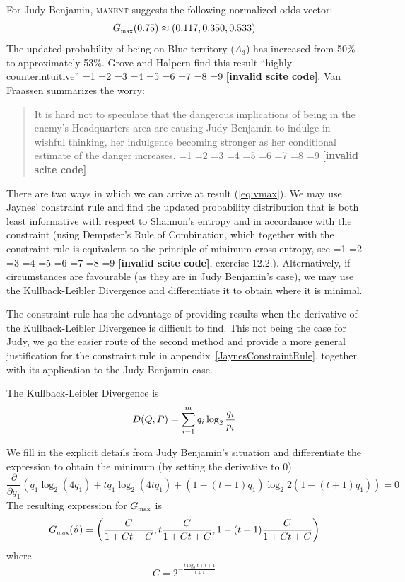 \documentclass[smallextended]{svjour3}       %
\newcommand{\nial}{\noindent} %
\newcommand{\qeins}[1]{``#1''}
\newcommand{\qvu}[0]{\vartheta}
\newcommand{\PageP}{p.~}
\newcommand{\PageP}{}
\newcommand{\scite}[3]{\ifnum#1=1\cite{#2}\else
\ifnum#1=2\cite[{\PageP}~#3]{#2}\else
\ifnum#1=3\cite[{\PageP}~#3]{#2}\else
\ifnum#1=4\cite{#2}\else
\ifnum#1=5\cite{#2}\else
\ifnum#1=6\cite[{\PageP}~#3]{#2}\else
\ifnum#1=7\cite{#2}\else
\ifnum#1=8\cite[{\PageP}~#3]{#2}\else
\ifnum#1=9\cite[{\PageP}~#3]{#2}\else
\textbf{[invalid scite code]}\fi\fi\fi\fi\fi\fi\fi\fi\fi}
\newenvironment{quotex}{\begin{quote}\begin{footnotesize}}{\end{footnotesize}\end{quote}}
\begin{document}
For Judy Benjamin, \textsc{maxent} suggests the following normalized
odds vector:
\begin{equation}
  \label{eq:vmax}
  G_{\mbox{{\tiny max}}}(0.75)\approx(0.117,0.350,0.533)
\end{equation}
The updated probability of being on Blue territory ($A_{3}$) has
increased from 50\% to approximately 53\%. Grove and Halpern find this
result \qeins{highly counterintuitive} \scite{2}{grovehalpern97}{2}.
Van Fraassen summarizes the worry:
\begin{quotex}
  It is hard not to speculate that the dangerous implications of being
  in the enemy's Headquarters area are causing Judy Benjamin to
  indulge in wishful thinking, her indulgence becoming stronger as her
  conditional estimate of the danger increases. \scite{3}{fraassen81}{379}
\end{quotex}

\bigskip

\nial There are two ways in which we can arrive at result
({\ref{eq:vmax}}). We may use Jaynes' constraint rule and find the
updated probability distribution that is both least informative with
respect to Shannon's entropy and in accordance with the constraint
(using Dempster's Rule of Combination, which together with the
constraint rule is equivalent to the principle of minimum
cross-entropy, see \scite{8}{coverthomas06}{409}, exercise 12.2.).
Alternatively, if circumstances are favourable (as they are in Judy
Benjamin's case), we may use the Kullback-Leibler Divergence and
differentiate it to obtain where it is minimal.


The constraint rule has the advantage of providing results when the
derivative of the Kullback-Leibler Divergence is difficult to find.
This not being the case for Judy, we go the easier route of the second
method and provide a more general justification for the constraint
rule in appendix~\ref{JaynesConstraintRule}, together with its
application to the Judy Benjamin case.

The Kullback-Leibler Divergence is
\begin{equation}
  D(Q,P)=\sum_{i=1}^{m}q_{i}\log_{2}\frac{q_{i}}{p_{i}}\notag
\end{equation}

We fill in the explicit details from Judy Benjamin's situation and
differentiate the expression to obtain the minimum (by setting the
derivative to $0$). 
\begin{displaymath}
\frac{\partial}{\partial{}q_{1}}(q_{1}\log_{2}(4q_{1})+tq_{1}\log_{2}(4tq_{1})+(1-(t+1)q_{1})\log_{2}2(1-(t+1)q_{1}))=0
\end{displaymath}
The resulting expression for $G_{\mbox{\tiny max}}$ is
\begin{displaymath}
  G_{\mbox{\tiny max}}({\qvu})=\left(\frac{C}{1+Ct+C},t\frac{C}{1+Ct+C},1-(t+1)\frac{C}{1+Ct+C}\right)
\end{displaymath}
where
\begin{displaymath}
  C=2^{-\frac{t\log_{2}t+t+1}{1+t}}
\end{displaymath}
\end{document}
